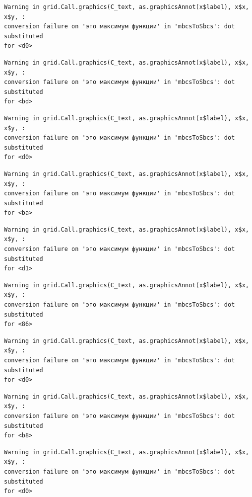 \documentclass[
  letterpaper,
  DIV=11,
  numbers=noendperiod]{scrreprt}
\theoremstyle{definition}
\theoremstyle{remark}
\begin{document}
\begin{verbatim}
Warning in grid.Call.graphics(C_text, as.graphicsAnnot(x$label), x$x, x$y, :
conversion failure on 'это максимум функции' in 'mbcsToSbcs': dot substituted
for <d0>
\end{verbatim}

\begin{verbatim}
Warning in grid.Call.graphics(C_text, as.graphicsAnnot(x$label), x$x, x$y, :
conversion failure on 'это максимум функции' in 'mbcsToSbcs': dot substituted
for <bd>
\end{verbatim}

\begin{verbatim}
Warning in grid.Call.graphics(C_text, as.graphicsAnnot(x$label), x$x, x$y, :
conversion failure on 'это максимум функции' in 'mbcsToSbcs': dot substituted
for <d0>
\end{verbatim}

\begin{verbatim}
Warning in grid.Call.graphics(C_text, as.graphicsAnnot(x$label), x$x, x$y, :
conversion failure on 'это максимум функции' in 'mbcsToSbcs': dot substituted
for <ba>
\end{verbatim}

\begin{verbatim}
Warning in grid.Call.graphics(C_text, as.graphicsAnnot(x$label), x$x, x$y, :
conversion failure on 'это максимум функции' in 'mbcsToSbcs': dot substituted
for <d1>
\end{verbatim}

\begin{verbatim}
Warning in grid.Call.graphics(C_text, as.graphicsAnnot(x$label), x$x, x$y, :
conversion failure on 'это максимум функции' in 'mbcsToSbcs': dot substituted
for <86>
\end{verbatim}

\begin{verbatim}
Warning in grid.Call.graphics(C_text, as.graphicsAnnot(x$label), x$x, x$y, :
conversion failure on 'это максимум функции' in 'mbcsToSbcs': dot substituted
for <d0>
\end{verbatim}

\begin{verbatim}
Warning in grid.Call.graphics(C_text, as.graphicsAnnot(x$label), x$x, x$y, :
conversion failure on 'это максимум функции' in 'mbcsToSbcs': dot substituted
for <b8>
\end{verbatim}

\begin{verbatim}
Warning in grid.Call.graphics(C_text, as.graphicsAnnot(x$label), x$x, x$y, :
conversion failure on 'это максимум функции' in 'mbcsToSbcs': dot substituted
for <d0>
\end{verbatim}
\end{document}
